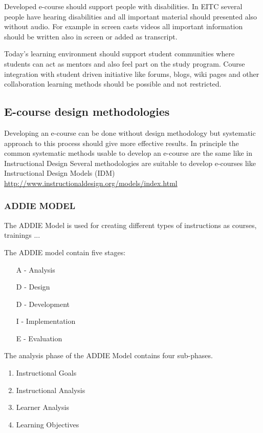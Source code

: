Developed e-course should support people with disabilities. In \gls{EITC} several people have hearing disabilities and all important material should presented also without audio. For example in screen casts videos all important information should be written also in screen or added as transcript.

Today’s learning environment should support student communities where students can act as mentors and also feel part on the study program. Course integration with student driven initiative like forums, blogs, wiki pages and other collaboration learning methods should be possible and not restricted.

\subsection{E-course design methodologies}
Developing an e-course can be done without design methodology but systematic approach to this process should give more effective results. In principle the common systematic methods usable to develop an e-course are the same like in Instructional Design 
Several methodologies are suitable to develop e-courses like Instructional Design Models (IDM)
\url{http://www.instructionaldesign.org/models/index.html}

\subsubsection{ADDIE MODEL}

The \gls{ADDIE Model} is used for creating different types of instructions as courses, trainings ...

The ADDIE model contain five stages:
\begin{itemize}
\item [A] - Analysis
\item [D] - Design
\item [D] - Development
\item [I] - Implementation
\item [E] - Evaluation
\end{itemize}

The analysis phase of the \gls{ADDIE Model} contains four sub-phases.
\begin{enumerate}
\item Instructional Goals
\item Instructional Analysis
\item Learner Analysis
\item Learning Objectives
\end{enumerate}

